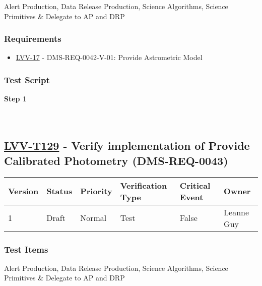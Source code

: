 Alert Production, Data Release Production, Science Algorithms, Science
Primitives \& Delegate to AP and DRP

\hypertarget{requirements-28}{%
\subsubsection{Requirements}\label{requirements-28}}

\begin{itemize}
\tightlist
\item
  \href{https://jira.lsstcorp.org/browse/LVV-17}{LVV-17} -
  DMS-REQ-0042-V-01: Provide Astrometric Model
\end{itemize}

\hypertarget{test-script-28}{%
\subsubsection{Test Script}\label{test-script-28}}

\textbf{Step 1}\\
~\\
~\\

\hypertarget{lvv-t129---verify-implementation-of-provide-calibrated-photometry-dms-req-0043}{%
\subsection{\texorpdfstring{\href{https://jira.lsstcorp.org/secure/Tests.jspa\#/testCase/LVV-T129}{LVV-T129}
- Verify implementation of Provide Calibrated Photometry
(DMS-REQ-0043)}{LVV-T129 - Verify implementation of Provide Calibrated Photometry (DMS-REQ-0043)}}\label{lvv-t129---verify-implementation-of-provide-calibrated-photometry-dms-req-0043}}

\begin{longtable}[]{@{}llllll@{}}
\toprule
Version & Status & Priority & Verification Type & Critical Event &
Owner\tabularnewline
\midrule
\endhead
1 & Draft & Normal & Test & False & Leanne Guy\tabularnewline
\bottomrule
\end{longtable}

\hypertarget{test-items-29}{%
\subsubsection{Test Items}\label{test-items-29}}

Alert Production, Data Release Production, Science Algorithms, Science
Primitives \& Delegate to AP and DRP

